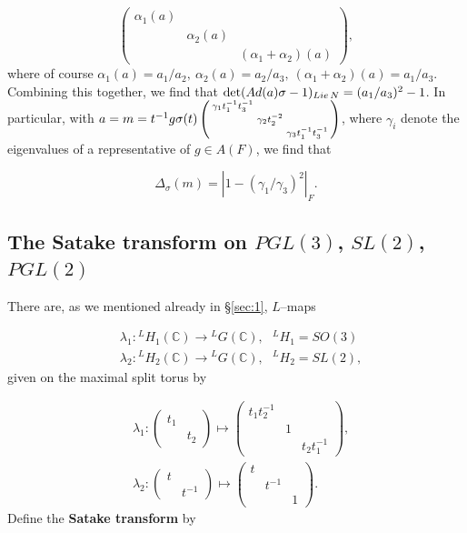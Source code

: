 \documentclass[12pt,letterpaper]{amsart}
\numberwithin{equation}{section}
\theoremstyle{definition}
\theoremstyle{plain}
\def\ccc{\mathbb{C}}
\begin{document}
\[
\left( 
\begin{array}{ccc} 
\alpha_1(a)&\ &\ \\
\ &\alpha_2(a)&\ \\
\ &\ &(\alpha_1+\alpha_2)(a)
\end{array} 
\right),
\]
where of course $\alpha_1(a) = a_1/a_2,\ \alpha_2(a) = a_2/a_3,
\ (\alpha_1 +\alpha_2)(a) = a_1/a_3$. Combining this together, we find
that ${\rm det} (Ad(a)\sigma -1)_{Lie\, N}= (a_1/a_3)^2-1$.
In particular, with $a = m = t^{-1}g\sigma (t) \left( \smallmatrix
\gamma_1t_1^{-1}t_3^{-1}&\ &\ \\
\ &\gamma_2t_2^{-2}&\ \\
\ &\ &\gamma_3t_1^{-1}t_3^{-1}\endsmallmatrix\right)$,
where $\gamma_i$ denote the eigenvalues of a representative of $g\in A(F)$,
we find that

\begin{equation}
\label{eqn:2.6}
\Delta_{\sigma}(m) = |1-(\gamma_1/\gamma_3)^2|_F.
\end{equation}

\subsection{The Satake transform on $PGL(3)$, $SL(2)$, $PGL(2)$}
\label{sec:2.3}

There are, as we mentioned already in \S \ref{sec:1}, $L$--maps

\[
\begin{split}
&\lambda_1:{^{L}H_1}(\ccc ) \rightarrow {^{L}G}(\ccc ),
\ \ \ {^{L}H_1} = SO(3)\\
&\lambda_2:{^{L}H_2}(\ccc ) \rightarrow {^{L}G}(\ccc ),
\ \ \ {^{L}H_2} = SL(2),
\end{split}
\]
given on the maximal split torus by

\[
\begin{split}
&\lambda_1 : 
\left( 
\begin{array}{cc} 
t_1&\ \\ 
\ &t_2
\end{array} 
\right) 
\longmapsto
\left( 
\begin{array}{ccc} 
t_1t_2^{-1}&\ &\ \\
\ &1&\ \\
\ &\ &t_2t_1^{-1}
\end{array} 
\right) ,\\
&\lambda_2 : 
\left( 
\begin{array}{ccc} 
t&\ \\ \ &t^{-1}
\end{array} 
\right) \longmapsto
\left( 
\begin{array}{ccc} 
t&\ &\ \\
\ &t^{-1}&\ \\
\ &\ &1
\end{array} 
\right) .
\end{split}
\]
Define the {\bf Satake transform} by
\end{document}
